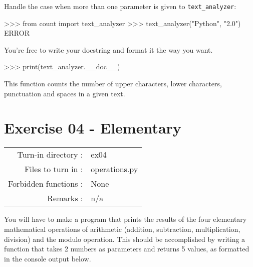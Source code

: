 \documentclass[]{article}
\newenvironment{Shaded}{\begin{snugshade}}{\end{snugshade}}
\newcommand{\NormalTok}[1]{\textcolor[rgb]{0.81,0.81,0.76}{#1}}
\begin{document}
Handle the case when more than one parameter is given to
\texttt{text\_analyzer}:

\begin{Shaded}
\begin{Highlighting}[]
\NormalTok{>>> from count import text_analyzer}
\NormalTok{>>> text_analyzer("Python", "2.0")}
\NormalTok{ERROR}
\end{Highlighting}
\end{Shaded}

You're free to write your docstring and format it the way you want.

\begin{Shaded}
\begin{Highlighting}[]
\NormalTok{>>> print(text_analyzer.__doc__)}

\NormalTok{    This function counts the number of upper characters, lower characters,}
\NormalTok{    punctuation and spaces in a given text.}
\end{Highlighting}
\end{Shaded}

\clearpage

\hypertarget{exercise-04---elementary-1}{%
\section{Exercise 04 - Elementary}\label{exercise-04---elementary-1}}

\begin{longtable}[]{@{}rl@{}}
\toprule
\endhead
Turn-in directory : & ex04\tabularnewline
Files to turn in : & operations.py\tabularnewline
Forbidden functions : & None\tabularnewline
Remarks : & n/a\tabularnewline
\bottomrule
\end{longtable}

You will have to make a program that prints the results of the four
elementary mathematical operations of arithmetic (addition, subtraction,
multiplication, division) and the modulo operation. This should be
accomplished by writing a function that takes 2 numbers as parameters
and returns 5 values, as formatted in the console output below.
\end{document}
